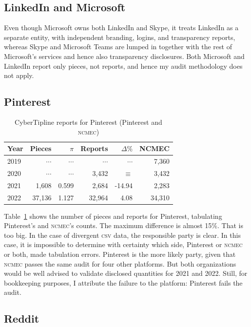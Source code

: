 \documentclass[nonacm,screen]{acmart}
\newcommand\V[1]{\textsc{\MakeLowercase{#1}}}
\begin{document}
\subsection{LinkedIn and Microsoft}

\noindent{}Even though Microsoft owns both LinkedIn and Skype, it treats
LinkedIn as a separate entity, with independent branding, logins, and
transparency reports, whereas Skype and Microsoft Teams are lumped in together
with the rest of Microsoft's services and hence also transparency disclosures.
Both Microsoft and LinkedIn report only pieces, not reports, and hence my audit
methodology does not apply.


\subsection{Pinterest}

\begin{table}[h!]
\centering\libertineLF
\caption{CyberTipline reports for Pinterest (Pinterest and \V{NCMEC})}
\label{tab:pinterest}
\begin{tabular}{l|rr|rrr}
\textbf{Year}
& \textbf{Pieces} & \textbf{$\pi$} & \textbf{Reports}
& \textbf{$\Delta\%$} & \textbf{NCMEC} \\ \hline
2019 & $\cdots$ & $\cdots$ & $\cdots$ & $\cdots$ & 7,360 \\
2020 & $\cdots$ & $\cdots$ & 3,432 & $\equiv$ & 3,432 \\
2021 & 1,608 & 0.599 & 2,684 & -14.94 & 2,283 \\
2022 & 37,136 & 1.127 & 32,964 & 4.08 & 34,310 \\
\end{tabular}
\end{table}

\noindent{}Table~\ref{tab:pinterest} shows the number of pieces and reports for
Pinterest, tabulating Pinterest's and \V{NCMEC}'s counts. The maximum difference
is almost 15\%. That is too big. In the case of divergent \V{CSV} data, the
responsible party is clear. In this case, it is impossible to determine with
certainty which side, Pinterest or \V{NCMEC} or both, made tabulation errors.
Pinterest is the more likely party, given that \V{NCMEC} passes the same audit
for four other platforms. But both organizations would be well advised to
validate disclosed quantities for 2021 and 2022. Still, for bookkeeping
purposes, I attribute the failure to the platform: Pinterest fails the audit.


\subsection{Reddit}
\end{document}
